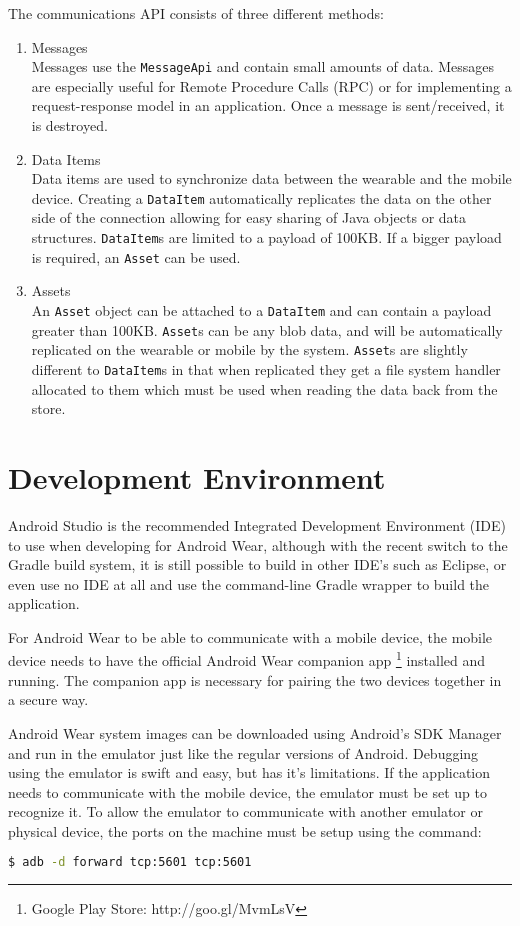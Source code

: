 The communications API consists of three different methods:
\begin{enumerate}

\item Messages\\
Messages use the \texttt{MessageApi} and contain small amounts of data. Messages
are especially useful for Remote Procedure Calls (RPC) or for implementing a
request-response model in an application. Once a message is sent/received, it
is destroyed.
\item Data Items\\
Data items are used to synchronize data between the wearable and the mobile
device. Creating a \texttt{DataItem} automatically replicates the data on the
other side of the connection allowing for easy sharing of Java objects or data
structures. \texttt{DataItem}s are limited to a payload of 100KB. If a bigger
payload is required, an \texttt{Asset} can be used.
\item Assets\\
An \texttt{Asset} object can be attached to a \texttt{DataItem} and can contain
a payload greater than 100KB. \texttt{Asset}s can be any blob data, and will be
automatically replicated on the wearable or mobile by the system.
\texttt{Asset}s are slightly different to \texttt{DataItem}s in that when
replicated they get a file system handler allocated to them which must be used
when reading the data back from the store.

\end{enumerate}

\section{Development Environment}
Android Studio is the recommended Integrated Development Environment (IDE) to
use when developing for Android Wear, although with the recent switch to the
Gradle build system, it is still possible to build in other IDE's such as
Eclipse, or even use no IDE at all and use the command-line Gradle wrapper to
build the application.

For Android Wear to be able to communicate with a mobile device, the mobile
device needs to have the official Android Wear companion app
\footnote{Google Play Store: http://goo.gl/MvmLsV}
installed and running. The companion app is necessary for pairing the two
devices together in a secure way.

Android Wear system images can be downloaded using Android's SDK Manager and run
in the emulator just like the regular versions of Android. Debugging using the
emulator is swift and easy, but has it's limitations. If the application needs
to communicate with the mobile device, the emulator must be set up to recognize
it. To allow the emulator to communicate with another emulator or physical
device, the ports on the machine must be setup using the command:
\begin{lstlisting}[language=Bash]
$ adb -d forward tcp:5601 tcp:5601
\end{lstlisting}

